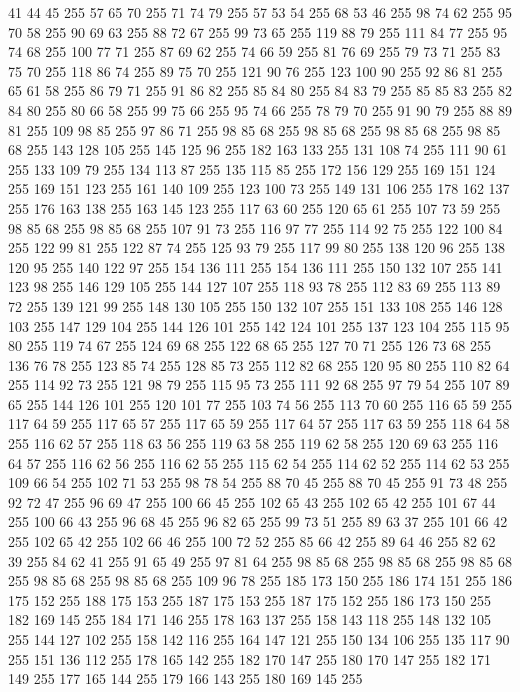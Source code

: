 41 44 45 255 57 65 70 255 71 74 79 255 57 53 54 255 68 53 46 255 98 74 62 255 95 70 58 255 90 69 63 255 88 72 67 255 99 73 65 255 119 88 79 255 111 84 77 255 95 74 68 255 100 77 71 255 87 69 62 255 74 66 59 255 81 76 69 255 79 73 71 255 83 75 70 255 118 86 74 255 89 75 70 255 121 90 76 255 123 100 90 255 92 86 81 255 65 61 58 255 86 79 71 255 91 86 82 255 85 84 80 255 84 83 79 255 85 85 83 255 82 84 80 255 80 66 58 255 99 75 66 255 95 74 66 255 78 79 70 255 91 90 79 255 88 89 81 255 109 98 85 255 97 86 71 255 98 85 68 255 98 85 68 255 98 85 68 255 98 85 68 255 143 128 105 255 145 125 96 255 182 163 133 255 131 108 74 255 111 90 61 255 133 109 79 255 134 113 87 255 135 115 85 255 172 156 129 255 169 151 124 255 169 151 123 255 161 140 109 255 123 100 73 255 149 131 106 255 178 162 137 255 176 163 138 255 163 145 123 255 117 63 60 255 120 65 61 255 107 73 59 255 98 85 68 255
98 85 68 255 107 91 73 255 116 97 77 255 114 92 75 255 122 100 84 255 122 99 81 255 122 87 74 255 125 93 79 255 117 99 80 255 138 120 96 255 138 120 95 255 140 122 97 255 154 136 111 255 154 136 111 255 150 132 107 255 141 123 98 255 146 129 105 255 144 127 107 255 118 93 78 255 112 83 69 255 113 89 72 255 139 121 99 255 148 130 105 255 150 132 107 255 151 133 108 255 146 128 103 255 147 129 104 255 144 126 101 255 142 124 101 255 137 123 104 255 115 95 80 255 119 74 67 255 124 69 68 255 122 68 65 255 127 70 71 255 126 73 68 255 136 76 78 255 123 85 74 255 128 85 73 255 112 82 68 255 120 95 80 255 110 82 64 255 114 92 73 255 121 98 79 255 115 95 73 255 111 92 68 255 97 79 54 255 107 89 65 255 144 126 101 255 120 101 77 255 103 74 56 255 113 70 60 255 116 65 59 255 117 64 59 255 117 65 57 255 117 65 59 255 117 64 57 255 117 63 59 255 118 64 58 255 116 62 57 255 118 63 56 255 119 63 58 255 119 62 58 255 120 69 63 255
116 64 57 255 116 62 56 255 116 62 55 255 115 62 54 255 114 62 52 255 114 62 53 255 109 66 54 255 102 71 53 255 98 78 54 255 88 70 45 255 88 70 45 255 91 73 48 255 92 72 47 255 96 69 47 255 100 66 45 255 102 65 43 255 102 65 42 255 101 67 44 255 100 66 43 255 96 68 45 255 96 82 65 255 99 73 51 255 89 63 37 255 101 66 42 255 102 65 42 255 102 66 46 255 100 72 52 255 85 66 42 255 89 64 46 255 82 62 39 255 84 62 41 255 91 65 49 255 97 81 64 255 98 85 68 255 98 85 68 255 98 85 68 255 98 85 68 255 98 85 68 255 109 96 78 255 185 173 150 255 186 174 151 255 186 175 152 255 188 175 153 255 187 175 153 255 187 175 152 255 186 173 150 255 182 169 145 255 184 171 146 255 178 163 137 255 158 143 118 255 148 132 105 255 144 127 102 255 158 142 116 255 164 147 121 255 150 134 106 255 135 117 90 255 151 136 112 255 178 165 142 255 182 170 147 255 180 170 147 255 182 171 149 255 177 165 144 255 179 166 143 255 180 169 145 255
